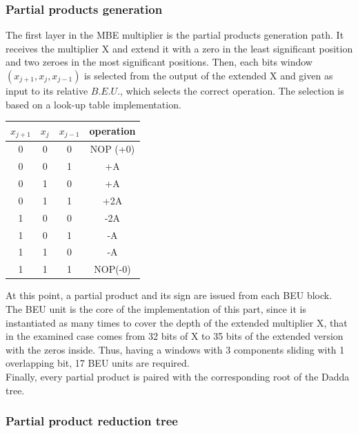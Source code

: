 \documentclass[a4paper, titlepage]{article}
\begin{document}
\subsubsection{Partial products generation}

The first layer in the MBE multiplier is the partial products generation path. 
\newline
It receives the multiplier X and extend it with a zero in the least significant position and two zeroes in the most significant positions. Then, each bits window $(x_{j+1}, x_{j}, x_{j-1})$ is selected from the output of the extended X and given as input to its relative $B.E.U.$,
which selects the correct operation.
The selection is based on a look-up table implementation.
\begin{center}
\begin{tabular}{c c c|c}
\multicolumn{1}{c}{$x_{j+1}$} &
\multicolumn{1}{c}{$x_j$} &
\multicolumn{1}{c|}{$x_{j-1}$} &
\multicolumn{1}{c}{operation}\\[0.8ex]
 \hline
0 & 0 & 0 & NOP \;(+0)\\
0 & 0 & 1 & +A\\
0 & 1 & 0 & +A\\
0 & 1 & 1 & +2A\\
1 & 0 & 0 & -2A\\
1 & 0 & 1 & -A\\
1 & 1 & 0 & -A\\
1 & 1 & 1 & NOP\;(-0)\\
\end{tabular}
\end{center}
\noindent
At this point, a partial product and its sign are issued from each BEU block.\\
The 
BEU unit is the core of the implementation of this part, since it is instantiated as many times to cover the depth of 
the extended multiplier X, that in the examined case comes from 32 bits of X to 35 bits of the extended version with the zeros inside. Thus, having a windows with 3 components sliding with 1 overlapping bit, 17 BEU units are required.\\
Finally, every partial product is paired with the corresponding root of the Dadda tree.

\subsubsection{Partial product reduction tree}
\end{document}
